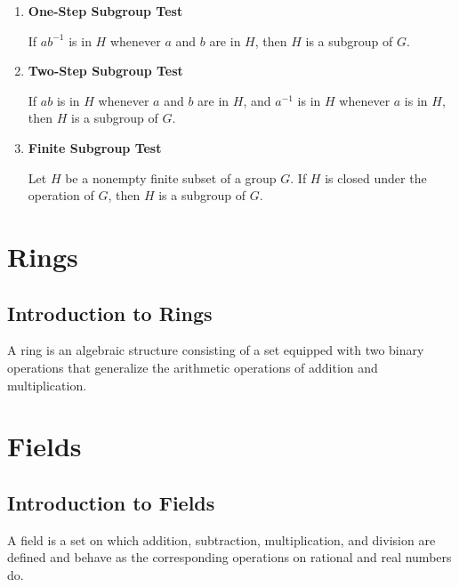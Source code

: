 \documentclass{report}
\newcommand{\inv}{^{-1}}
\begin{document}
\begin{methods}[title={Subgroup Tests}]
\begin{enumerate}
  \item \textbf{One-Step Subgroup Test}
  
  If $ab\inv$ is in $H$ whenever $a$ and $b$ are in $H$, then $H$ is a subgroup of $G$.
  
  \item \textbf{Two-Step Subgroup Test}
  
  If $ab$ is in $H$ whenever $a$ and $b$ are in $H$, and $a\inv$ is in $H$ whenever $a$ is in $H$, then $H$ is a subgroup of $G$.

  \item \textbf{Finite Subgroup Test}
  
  Let $H$ be a nonempty finite subset of a group $G$. If $H$ is closed under the operation of $G$,
  then $H$ is a subgroup of $G$.
\end{enumerate}
\end{methods}

\chapter{Rings}
\section{Introduction to Rings}

\begin{definition}[title={Ring}]
A ring is an algebraic structure consisting of a set equipped with two binary operations that generalize the arithmetic operations of addition and multiplication.
\end{definition}

\chapter{Fields}
\section{Introduction to Fields}

\begin{definition}[title={Field}]
A field is a set on which addition, subtraction, multiplication, and division are defined and behave as the corresponding operations on rational and real numbers do.
\end{definition}
\end{document}
